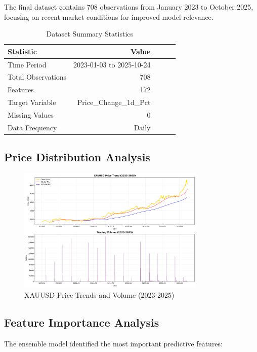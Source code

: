\documentclass[12pt,a4paper]{article}
\begin{document}
The final dataset contains 708 observations from January 2023 to October 2025, focusing on recent market conditions for improved model relevance.

\begin{table}[H]
\centering
\caption{Dataset Summary Statistics}
\label{tab:dataset_summary}
\begin{tabular}{@{}lrrrr@{}}
\toprule
Statistic & Value \\
\midrule
Time Period & 2023-01-03 to 2025-10-24 \\
Total Observations & 708 \\
Features & 172 \\
Target Variable & Price\_Change\_1d\_Pct \\
Missing Values & 0 \\
Data Frequency & Daily \\
\bottomrule
\end{tabular}
\end{table}

\subsection{Price Distribution Analysis}

\begin{figure}[H]
\centering
\includegraphics[width=0.8\textwidth]{XAUUSD_2023_2025_price_analysis.png}
\caption{XAUUSD Price Trends and Volume (2023-2025)}
\label{fig:price_trends}
\end{figure}

\subsection{Feature Importance Analysis}

The ensemble model identified the most important predictive features:
\end{document}
